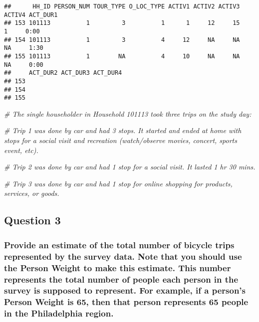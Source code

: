 \documentclass[
]{article}
\newenvironment{Shaded}{\begin{snugshade}}{\end{snugshade}}
\newcommand{\CommentTok}[1]{\textcolor[rgb]{0.56,0.35,0.01}{\textit{#1}}}
\begin{document}
\begin{verbatim}
##      HH_ID PERSON_NUM TOUR_TYPE O_LOC_TYPE ACTIV1 ACTIV2 ACTIV3 ACTIV4 ACT_DUR1
## 153 101113          1         3          1      1     12     15      1     0:00
## 154 101113          1         3          4     12     NA     NA     NA     1:30
## 155 101113          1        NA          4     10     NA     NA     NA     0:00
##     ACT_DUR2 ACT_DUR3 ACT_DUR4
## 153                           
## 154                           
## 155
\end{verbatim}

\begin{Shaded}
\begin{Highlighting}[]
\CommentTok{\# The single householder in Household 101113 took three trips on the study day: }

    \CommentTok{\# Trip 1 was done by car and had 3 stops. It started and ended at home with stops for a social visit and recreation (watch/observe movies, concert, sports         event, etc).  }

    \CommentTok{\# Trip 2 was done by car and had 1 stop for a social visit. It lasted 1 hr 30 mins.  }

    \CommentTok{\# Trip 3 was done by car and had 1 stop for online shopping for products, services, or goods.  }
\end{Highlighting}
\end{Shaded}

\hypertarget{question-3}{%
\subsection{Question 3}\label{question-3}}

\hypertarget{provide-an-estimate-of-the-total-number-of-bicycle-trips-represented-by-the-survey-data.-note-that-you-should-use-the-person-weight-to-make-this-estimate.-this-number-represents-the-total-number-of-people-each-person-in-the-survey-is-supposed-to-represent.-for-example-if-a-persons-person-weight-is-65-then-that-person-represents-65-people-in-the-philadelphia-region.}{%
\subsubsection{Provide an estimate of the total number of bicycle trips
represented by the survey data. Note that you should use the Person
Weight to make this estimate. This number represents the total number of
people each person in the survey is supposed to represent. For example,
if a person's Person Weight is 65, then that person represents 65 people
in the Philadelphia
region.}\label{provide-an-estimate-of-the-total-number-of-bicycle-trips-represented-by-the-survey-data.-note-that-you-should-use-the-person-weight-to-make-this-estimate.-this-number-represents-the-total-number-of-people-each-person-in-the-survey-is-supposed-to-represent.-for-example-if-a-persons-person-weight-is-65-then-that-person-represents-65-people-in-the-philadelphia-region.}}
\end{document}
